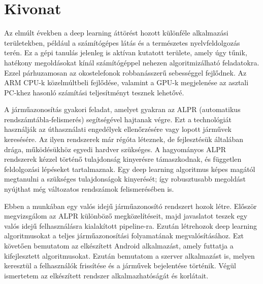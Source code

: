\setcounter{page}{1}

\selecthungarian

\chapter*{Kivonat}

Az elmúlt években a deep learning áttörést hozott különféle alkalmazási területekben, például a számítógépes látás és a természetes nyelvfeldolgozás terén. Ez a gépi tanulás jelenleg is aktívan kutatott területe, amely úgy tűnik, hatékony megoldásokat kínál számítógéppel nehezen algoritmizálható feladatokra. Ezzel párhuzamosan az okostelefonok robbanásszerű sebességgel fejlődnek. Az ARM CPU-k közelmúltbeli fejlődése, valamint a GPU-k megjelenése az asztali PC-khez hasonló számítási teljesítményt tesznek lehetővé.

A járműazonosítás gyakori feladat, amelyet gyakran az ALPR (automatikus rendszámtábla-felismerés) segítségével hajtanak végre. Ezt a technológiát használják az úthasználati engedélyek ellenőrzésére vagy lopott járművek keresésére. Az ilyen rendszerek már régóta léteznek, de fejlesztésük általában drága, működésükhöz egyedi hardver szükséges. A hagyományos ALPR rendszerek kézzel történő tulajdonság kinyerésre támaszkodnak, és független feldolgozási lépéseket tartalmaznak. Egy deep learning algoritmus képes magától megtanulni a szükséges tulajdonságok kinyerését; így robusztusabb megoldást nyújthat még változatos rendszámok felismerésében is.

Ebben a munkában egy valós idejű járműazonosító rendszert hozok létre. Először megvizsgálom az ALPR különböző megközelítéseit, majd javaslatot teszek egy valós idejű felhasználásra kialakított pipeline-ra. Ezután létrehozok deep learning algoritmusokat a teljes járműazonosítási folyamatának megvalósításához. Ezt követően bemutatom az elkészített Android alkalmazást, amely futtatja a kifejlesztett algoritmusokat. Ezután bemutatom a szerver alkalmazást is, melyen keresztül a felhasználók frissítése és a járművek bejelentése történik. Végül ismertetem az elkészített rendszer alkalmazhatóságát és korlátait.


\vfill
\selectenglish

